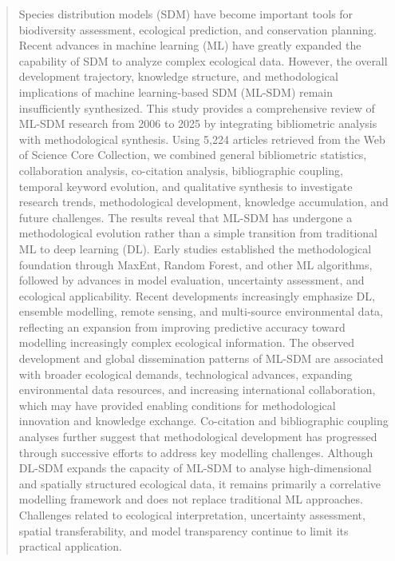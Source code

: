 \documentclass[authoryear,preprint,review,12pt]{elsarticle}
\begin{document}
\begin{frontmatter}
\author[fourth]{Yanping Wang }


\author[first]{Jie Xie }


\begin{abstract}

Species distribution models (SDM) have become important tools for biodiversity assessment, ecological prediction, and conservation planning. Recent advances in machine learning (ML) have greatly expanded the capability of SDM to analyze complex ecological data. However, the overall development trajectory, knowledge structure, and methodological implications of machine learning-based SDM (ML-SDM) remain insufficiently synthesized. This study provides a comprehensive review of ML-SDM research from 2006 to 2025 by integrating bibliometric analysis with methodological synthesis. Using 5,224 articles retrieved from the Web of Science Core Collection, we combined general bibliometric statistics, collaboration analysis, co-citation analysis, bibliographic coupling, temporal keyword evolution, and qualitative synthesis to investigate research trends, methodological development, knowledge accumulation, and future challenges. The results reveal that ML-SDM has undergone a methodological evolution rather than a simple transition from traditional ML to deep learning (DL). Early studies established the methodological foundation through MaxEnt, Random Forest, and other ML algorithms, followed by advances in model evaluation, uncertainty assessment, and ecological applicability. Recent developments increasingly emphasize DL, ensemble modelling, remote sensing, and multi-source environmental data, reflecting an expansion from improving predictive accuracy toward modelling increasingly complex ecological information. The observed development and global dissemination patterns of ML-SDM are associated with broader ecological demands, technological advances, expanding environmental data resources, and increasing international collaboration, which may have provided enabling conditions for methodological innovation and knowledge exchange. Co-citation and bibliographic coupling analyses further suggest that methodological development has progressed through successive efforts to address key modelling challenges. Although DL-SDM expands the capacity of ML-SDM to analyse high-dimensional and spatially structured ecological data, it remains primarily a correlative modelling framework and does not replace traditional ML approaches. Challenges related to ecological interpretation, uncertainty assessment, spatial transferability, and model transparency continue to limit its practical application.




\end{abstract}
\end{frontmatter}
\end{document}
